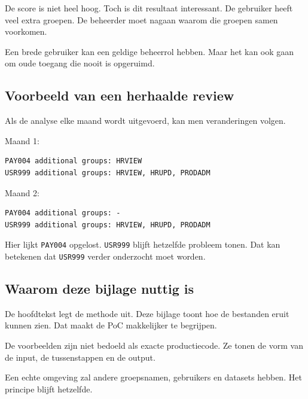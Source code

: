 De score is niet heel hoog. Toch is dit resultaat interessant. De gebruiker heeft veel extra groepen. De beheerder moet nagaan waarom die groepen samen voorkomen.

Een brede gebruiker kan een geldige beheerrol hebben. Maar het kan ook gaan om oude toegang die nooit is opgeruimd.

\subsection*{Voorbeeld van een herhaalde review}

Als de analyse elke maand wordt uitgevoerd, kan men veranderingen volgen.

Maand 1:

\begin{verbatim}
PAY004 additional groups: HRVIEW
USR999 additional groups: HRVIEW, HRUPD, PRODADM
\end{verbatim}

Maand 2:

\begin{verbatim}
PAY004 additional groups: -
USR999 additional groups: HRVIEW, HRUPD, PRODADM
\end{verbatim}

Hier lijkt \texttt{PAY004} opgelost. \texttt{USR999} blijft hetzelfde probleem tonen. Dat kan betekenen dat \texttt{USR999} verder onderzocht moet worden.

\subsection*{Waarom deze bijlage nuttig is}

De hoofdtekst legt de methode uit. Deze bijlage toont hoe de bestanden eruit kunnen zien. Dat maakt de PoC makkelijker te begrijpen.

De voorbeelden zijn niet bedoeld als exacte productiecode. Ze tonen de vorm van de input, de tussenstappen en de output.

Een echte omgeving zal andere groepsnamen, gebruikers en datasets hebben. Het principe blijft hetzelfde.
